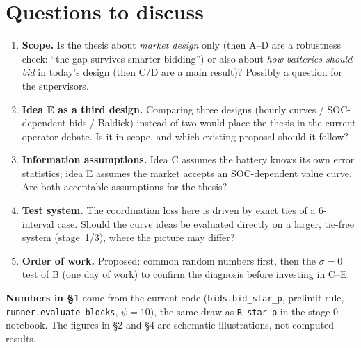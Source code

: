 \documentclass[10pt,a4paper]{article}
\newcommand{\code}[1]{\texttt{#1}}
\begin{document}
\section{Questions to discuss}
\begin{enumerate}
  \item \textbf{Scope.} Is the thesis about \emph{market design} only (then A--D are a robustness check: ``the gap
    survives smarter bidding'') or also about \emph{how batteries should bid} in today's design (then C/D are a main
    result)? Possibly a question for the supervisors.
  \item \textbf{Idea E as a third design.} Comparing three designs (hourly curves / SOC-dependent bids / Baldick)
    instead of two would place the thesis in the current operator debate. Is it in scope, and which existing
    proposal should it follow?
  \item \textbf{Information assumptions.} Idea C assumes the battery knows its own error statistics; idea E assumes
    the market accepts an SOC-dependent value curve. Are both acceptable assumptions for the thesis?
  \item \textbf{Test system.} The coordination loss here is driven by exact ties of a 6-interval case. Should the
    curve ideas be evaluated directly on a larger, tie-free system (stage~1/3), where the picture may differ?
  \item \textbf{Order of work.} Proposed: common random numbers first, then the $\sigma=0$ test of B (one day of
    work) to confirm the diagnosis before investing in C--E.
\end{enumerate}

{\small\textbf{Numbers in \S1} come from the current code (\code{bids.bid\_star\_p}, prelimit rule,
\code{runner.evaluate\_blocks}, $\psi=10$), the same draw as \code{B\_star\_p} in the stage-0 notebook.
The figures in \S2 and \S4 are schematic illustrations, not computed results.}
\end{document}
